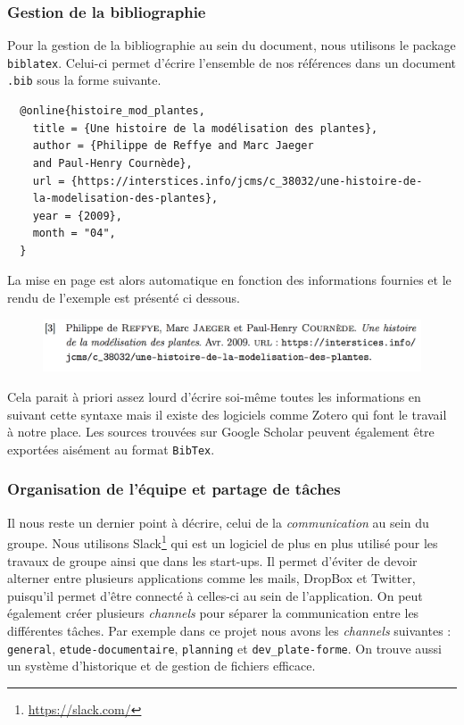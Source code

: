 \subsubsection*{Gestion de la bibliographie}
Pour la gestion de la bibliographie au sein du document,
nous utilisons le package \texttt{biblatex}.
Celui-ci permet d'écrire l'ensemble de nos références dans un document \texttt{.bib}
sous la forme suivante.
\begin{verbatim}
  @online{histoire_mod_plantes,
    title = {Une histoire de la modélisation des plantes},
    author = {Philippe de Reffye and Marc Jaeger 
    and Paul-Henry Cournède},
    url = {https://interstices.info/jcms/c_38032/une-histoire-de-
    la-modelisation-des-plantes},
    year = {2009},
    month = "04",
  }
\end{verbatim}
La mise en page est alors automatique en fonction des informations fournies
et le rendu de l'exemple est présenté ci dessous.
\begin{figure}[h]
  \includegraphics[scale=0.6]{./img/rendu_elem_bib.jpg}
\end{figure}

Cela parait à priori assez lourd d'écrire soi-même toutes les informations
en suivant cette syntaxe mais il existe des logiciels comme Zotero
qui font le travail à notre place.
Les sources trouvées sur Google Scholar peuvent également être exportées
aisément au format \texttt{BibTex}.
           
\subsubsection*{Organisation de l'équipe et partage de tâches}
Il nous reste un dernier point à décrire, celui de la \emph{communication}
au sein du groupe.
Nous utilisons Slack\footnote{\url{https://slack.com/}} qui est un logiciel
de plus en plus utilisé pour les travaux de groupe ainsi que dans les start-ups.
Il permet d'éviter de devoir alterner entre plusieurs applications comme les mails,
DropBox et Twitter, puisqu'il permet d'être connecté
à celles-ci au sein de l'application.
On peut également créer plusieurs \emph{channels} pour séparer la communication
entre les différentes tâches.
Par exemple dans ce projet nous avons les \emph{channels} suivantes :
\texttt{general}, \texttt{etude-documentaire}, 
\texttt{planning} et \texttt{dev\_plate-forme}.
On trouve aussi un système d'historique et de gestion de fichiers efficace.

